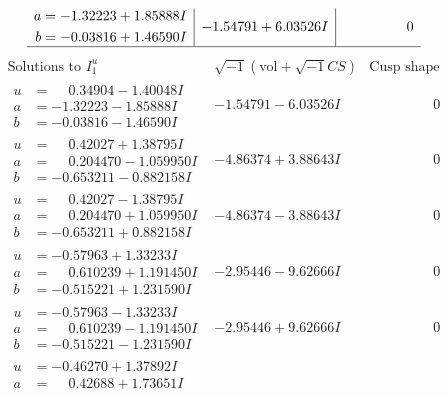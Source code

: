 \documentclass[1p]{elsarticle_modified}
\theoremstyle{definition}
\newcommand{\I}{\sqrt{-1}}
\begin{document}
$$\begin{array}{c|c|c}
\begin{aligned}
a &= -1.32223 + 1.85888 I \\
b &= -0.03816 + 1.46590 I\end{aligned}
 & -1.54791 + 6.03526 I & \phantom{-0.000000 } 0\\
 \hline 
 \end{array}$$\newpage$$\begin{array}{c|c|c}  
\text{Solutions to }I^u_{1}& \I (\text{vol} + \sqrt{-1}CS) & \text{Cusp shape}\\
 \hline 
\begin{aligned}
u &= \phantom{-}0.34904 - 1.40048 I \\
a &= -1.32223 - 1.85888 I \\
b &= -0.03816 - 1.46590 I\end{aligned}
 & -1.54791 - 6.03526 I & \phantom{-0.000000 } 0 \\ \hline\begin{aligned}
u &= \phantom{-}0.42027 + 1.38795 I \\
a &= \phantom{-}0.204470 - 1.059950 I \\
b &= -0.653211 - 0.882158 I\end{aligned}
 & -4.86374 + 3.88643 I & \phantom{-0.000000 } 0 \\ \hline\begin{aligned}
u &= \phantom{-}0.42027 - 1.38795 I \\
a &= \phantom{-}0.204470 + 1.059950 I \\
b &= -0.653211 + 0.882158 I\end{aligned}
 & -4.86374 - 3.88643 I & \phantom{-0.000000 } 0 \\ \hline\begin{aligned}
u &= -0.57963 + 1.33233 I \\
a &= \phantom{-}0.610239 + 1.191450 I \\
b &= -0.515221 + 1.231590 I\end{aligned}
 & -2.95446 - 9.62666 I & \phantom{-0.000000 } 0 \\ \hline\begin{aligned}
u &= -0.57963 - 1.33233 I \\
a &= \phantom{-}0.610239 - 1.191450 I \\
b &= -0.515221 - 1.231590 I\end{aligned}
 & -2.95446 + 9.62666 I & \phantom{-0.000000 } 0 \\ \hline\begin{aligned}
u &= -0.46270 + 1.37892 I \\
a &= \phantom{-}0.42688 + 1.73651 I \\

\end{aligned}
\end{array}$$
\end{document}
